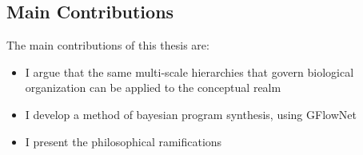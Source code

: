 \subsection{Main Contributions}
The main contributions of this thesis are: 
\begin{itemize}
    \item I argue that the same multi-scale hierarchies that govern biological organization can be applied to the conceptual realm
    \item I develop a method of bayesian program synthesis, using GFlowNet
    \item I present the philosophical ramifications
\end{itemize}




